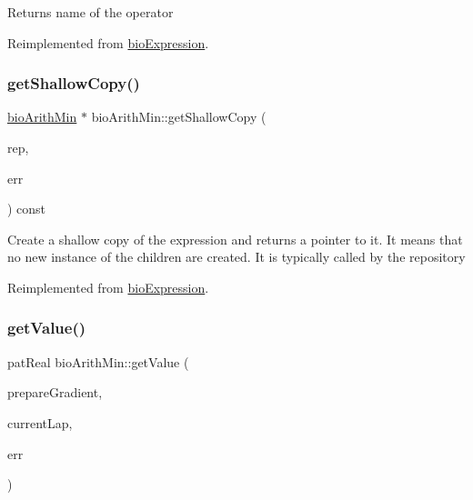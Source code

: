 \begin{DoxyReturn}{Returns}
name of the operator 
\end{DoxyReturn}


Reimplemented from \hyperlink{classbio_expression_a2353a4afb3a2b0af7c63aba086a72bde}{bio\+Expression}.

\mbox{\label{classbio_arith_min_a30ded7c95902dd535ba172b2bd4918de}} 
\subsubsection{\texorpdfstring{get\+Shallow\+Copy()}{getShallowCopy()}}
{\footnotesize\ttfamily \hyperlink{classbio_arith_min}{bio\+Arith\+Min} $\ast$ bio\+Arith\+Min\+::get\+Shallow\+Copy (\begin{DoxyParamCaption}\item[{\hyperlink{classbio_expression_repository}{bio\+Expression\+Repository} $\ast$}]{rep,  }\item[{pat\+Error $\ast$\&}]{err }\end{DoxyParamCaption}) const\hspace{0.3cm}{\ttfamily [virtual]}}

Create a shallow copy of the expression and returns a pointer to it. It means that no new instance of the children are created. It is typically called by the repository 

Reimplemented from \hyperlink{classbio_expression_a442534762693b92baaf33928979a1bf8}{bio\+Expression}.

\mbox{\label{classbio_arith_min_a809fd63d92823ab01e0a6af0192c5d2e}} 
\subsubsection{\texorpdfstring{get\+Value()}{getValue()}}
{\footnotesize\ttfamily pat\+Real bio\+Arith\+Min\+::get\+Value (\begin{DoxyParamCaption}\item[{pat\+Boolean}]{prepare\+Gradient,  }\item[{pat\+U\+Long}]{current\+Lap,  }\item[{pat\+Error $\ast$\&}]{err }\end{DoxyParamCaption})\hspace{0.3cm}{\ttfamily [virtual]}}

